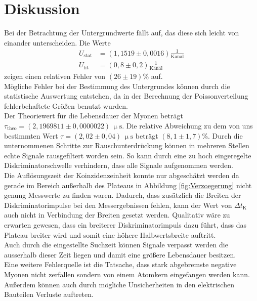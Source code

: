\section{Diskussion}
\label{sec:Diskussion}
Bei der Betrachtung der Untergrundwerte fällt auf, das diese sich leicht von einander unterscheiden.
Die Werte
\begin{align*}
  U_{\text{stat}}&=(1,1519\pm0,0016)\frac{1}{\text{Kanal}}\\
  U_{\text{fit}}&=(0,8 \pm 0,2) \frac{1}{\text{Kanal}}
\end{align*}
zeigen einen relativen Fehler von $(26\pm19)\%$ auf.\\
Mögliche Fehler bei der Bestimmung des Untergrundes können durch die statistische Auswertung entstehen, da in der Berechnung der
Poissonverteilung fehlerbehaftete Größen benutzt wurden.\\
Der Theoriewert für die Lebensdauer der Myonen beträgt $\tau_{\text{theo}}=(2,1969811\pm0,0000022)\,\upmu\text{s}$\cite{Lebensdauer}.
Die relative Abweichung zu dem von uns bestimmten Wert $\tau=(2,02\pm0,04)\,\upmu\text{s}$ beträgt $(8,1\pm1,7)\%$.
Durch die unternommenen Schritte zur Rauschunterdrückung können in mehreren Stellen echte Signale rausgefiltert worden sein.
So kann durch eine zu hoch eingeregelte Diskriminatorschwelle verhindern, dass alle Signale aufgenommen werden.\\
Die Auflösungszeit der Koinzidenzeinheit konnte nur abgeschätzt werden da gerade im Bereich außerhalb des Plateaus
in Abbildung \ref{fig:Verzoegerung} nicht genung Messwerte zu finden waren.
Dadurch, dass zusätzlich die Breiten der Diskriminatorimpulse bei den Messergebnissen fehlen,
kann der Wert von $\Delta t_\text{K}$ auch nicht in Verbindung der Breiten gesetzt werden.
Qualitativ wäre zu erwarten gewesen, dass ein breiterer Diskriminatorimpuls dazu führt, dass das Plateau
breiter wird und somit eine höhere Halbwertsbreite auftritt.\\
Auch durch die eingestellte Suchzeit können Signale verpasst werden die ausserhalb dieser Zeit liegen und damit eine größere
Lebensdauer besitzen.\\
Eine weitere Fehlerquelle ist die Tatsache, dass stark abgebremste negative Myonen nicht zerfallen
sondern von einem Atomkern eingefangen werden kann.\\
Außerdem können auch durch mögliche Unsicherheiten in den elektrischen Bauteilen Verluste auftreten.\\
